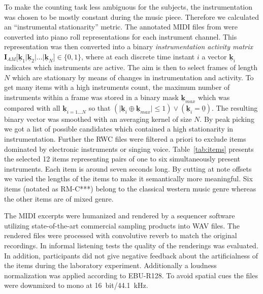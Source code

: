 To make the counting task less ambiguous for the subjects, the instrumentation was chosen to be mostly constant during the music piece.
Therefore we calculated an ``instrumental stationarity'' metric.
The annotated MIDI files from \cite{rwc} were converted into piano roll representations for each instrument channel. This representation was then converted into a binary \emph{instrumentation activity matrix} $\mathbf{I}_{AM}\lbrack \mathbf{\underline{k}}_1 \vert \mathbf{\underline{k}}_2 \vert  ... \vert \mathbf{\underline{k}}_N \rbrack \in \{0,1\}$, where at each discrete time instant $i$ a vector $\mathbf{\underline{k}}_i$ indicates which instruments are active. The aim is then to select frames of length $N$ which are stationary by means of changes in instrumentation and activity. To get many items with a high instruments count, the maximum number of instruments within a frame was stored in a binary mask $\mathbf{\underline{k}}_{max}$ which was compared with all $\mathbf{\underline{k}}_{i=1...N}$ so that $(\vert\mathbf{\underline{k}}_{i} \oplus \mathbf{\underline{k}}_{max}\vert \leq 1) \lor (\mathbf{\underline{k}}_{i} = \underline{0})$. The resulting binary vector was smoothed with an averaging kernel of size $N$. By peak picking we got a list of possible candidates which contained a high stationarity in instrumentation.
Further the RWC files were filtered a priori to exclude items dominated by electronic instruments or singing voice. Table~\ref{tab:items} presents the selected 12 items representing pairs of one to six simultaneously present instruments. Each item is around seven seconds long. By cutting at note offsets we varied the lengths of the items to make it semantically more meaningful. Six items (notated as RM-C***) belong to the classical western music genre whereas the other items are of mixed genre.
\par
The MIDI excerpts were humanized and rendered by a sequencer software utilizing state-of-the-art commercial sampling products into WAV files. The rendered files were processed with convolutive reverb to match the original recordings. In informal listening tests the quality of the renderings was evaluated. In addition, participants did not give negative feedback about the artificialness of the items during the laboratory experiment. Additionally a loudness normalization was applied according to EBU-R128\cite{EBU2011}. To avoid spatial cues the files were downmixed to mono at 16~bit/44.1~kHz.

